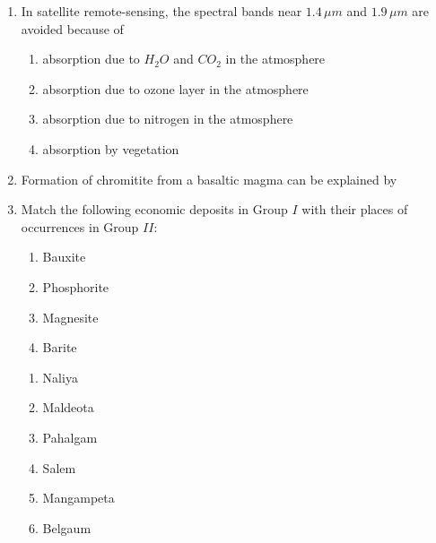 \documentclass[journal,12pt,onecolumn]{IEEEtran}
\theoremstyle{remark}
\begin{document}
\begin{enumerate}
    \item In satellite remote-sensing, the spectral bands near $1.4\,\mu m$ and $1.9\,\mu m$ are avoided because of \hfill{} 
        \begin{enumerate}
                \item absorption due to $H_2O$ and $CO_2$ in the atmosphere
                \item absorption due to ozone layer in the atmosphere
                \item absorption due to nitrogen in the atmosphere
                \item absorption by vegetation               
            \end{enumerate}
    \item Formation of chromitite from a basaltic magma can be explained by \hfill{} 
        \begin {enumerate}
            \end{enumerate}
    \item Match the following economic deposits in Group $I$ with their places of occurrences in Group $II$: \hfill{} 
    \begin{multicols}{2}
            \begin{enumerate}[start=16]
                \item Bauxite
                \item Phosphorite
                \item Magnesite
                \item Barite
            \end{enumerate}
            
            \columnbreak
            
            \begin{enumerate} 
                \item Naliya
                \item Maldeota
                \item Pahalgam
                \item Salem
                \item Mangampeta
                \item Belgaum
            \end{enumerate}
            


\end{multicols}
\end{enumerate}
\end{document}
